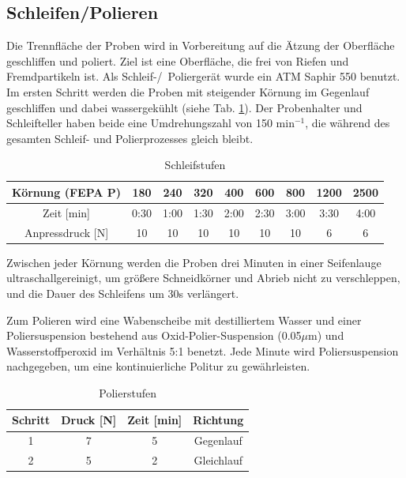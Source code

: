 \subsection*{Schleifen/Polieren}

Die Trennfläche der Proben wird in Vorbereitung auf die Ätzung der Oberfläche geschliffen und poliert. Ziel ist eine Oberfläche, die frei von Riefen und Fremdpartikeln ist. Als Schleif-/~Poliergerät wurde ein ATM Saphir 550 benutzt.
Im ersten Schritt werden die Proben mit steigender Körnung im Gegenlauf geschliffen und dabei wassergekühlt (siehe Tab. \ref{tab:Schleifstufen}). Der Probenhalter und Schleifteller haben beide eine Umdrehungszahl von 150 min$^{-1}$, die während des gesamten Schleif- und Polierprozesses gleich bleibt.   

\begin{table}[]
	\centering
	\begin{tabular}{|c|c|c|c|c|c|c|c|c|}
		
		\hline 
		Körnung (FEPA P) & 180 & 240 & 320 & 400 & 600 & 800 & 1200 & 2500 \\ 
		\hline 
		Zeit [min] & 0:30 & 1:00 & 1:30 & 2:00 & 2:30 & 3:00 & 3:30 & 4:00 \\ 
		\hline 
		Anpressdruck [N] & 10&10&10&10&10&10&6&6\\
		\hline
	\end{tabular} 
	\caption{Schleifstufen}
	\label{tab:Schleifstufen}
\end{table}

Zwischen jeder Körnung werden die Proben drei Minuten in einer Seifenlauge ultraschallgereinigt, um größere Schneidkörner und Abrieb nicht zu verschleppen, und die Dauer des Schleifens um 30s verlängert. 

Zum Polieren wird eine Wabenscheibe mit destilliertem Wasser und einer Poliersuspension bestehend aus Oxid-Polier-Suspension (0.05$\mu$m) und Wasserstoffperoxid im Verhältnis 5:1 benetzt. Jede Minute wird Poliersuspension nachgegeben, um eine kontinuierliche Politur zu gewährleisten.

\begin{table}[h]
	\centering
	
	\begin{tabular}{|c|c|c|c|}
		\hline 
		Schritt & Druck [N] & Zeit [min] & Richtung \\ 
		\hline 
		1 & 7 & 5 & Gegenlauf \\ 
		\hline 
		2 & 5 & 2 & Gleichlauf \\ 
		\hline 
	\end{tabular} 
	\caption{Polierstufen}
	\label{tab:Polierstufen}
\end{table}


